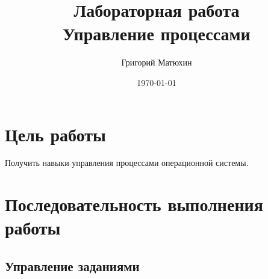 \documentclass[12pt]{article}
\author{Григорий Матюхин}
\date{\today}
\title{Лабораторная работа \textnumero6\\Управление процессами}
\begin{document}
\maketitle
\newpage
\tableofcontents
\newpage
\section{Цель работы}
Получить навыки управления процессами операционной системы.
\section{Последовательность выполнения работы}

\subsection{Управление заданиями}
\end{document}
